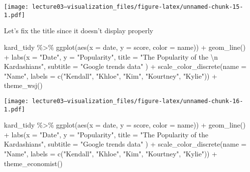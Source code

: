 \documentclass[
]{article}
\newenvironment{Shaded}{\begin{snugshade}}{\end{snugshade}}
\newcommand{\AttributeTok}[1]{\textcolor[rgb]{0.77,0.63,0.00}{#1}}
\newcommand{\FunctionTok}[1]{\textcolor[rgb]{0.00,0.00,0.00}{#1}}
\newcommand{\NormalTok}[1]{#1}
\newcommand{\SpecialCharTok}[1]{\textcolor[rgb]{0.00,0.00,0.00}{#1}}
\newcommand{\StringTok}[1]{\textcolor[rgb]{0.31,0.60,0.02}{#1}}
\begin{document}
\texttt{[image: lecture03---visualization\_files/figure-latex/unnamed-chunk-15-1.pdf]}

Let's fix the title since it doesn't display properly

\begin{Shaded}
\begin{Highlighting}[]
\NormalTok{kard\_tidy }\SpecialCharTok{\%\textgreater{}\%} 
  \FunctionTok{ggplot}\NormalTok{(}\FunctionTok{aes}\NormalTok{(}\AttributeTok{x =}\NormalTok{ date, }\AttributeTok{y =}\NormalTok{ score, }\AttributeTok{color =}\NormalTok{ name)) }\SpecialCharTok{+}
  \FunctionTok{geom\_line}\NormalTok{() }\SpecialCharTok{+}
  \FunctionTok{labs}\NormalTok{(}\AttributeTok{x =} \StringTok{"Date"}\NormalTok{,}
       \AttributeTok{y =} \StringTok{"Popularity"}\NormalTok{,}
       \AttributeTok{title =} \StringTok{"The Popularity of the }\SpecialCharTok{\textbackslash{}n}\StringTok{ Kardashians"}\NormalTok{,}
       \AttributeTok{subtitle =} \StringTok{"Google trends data"}
\NormalTok{       ) }\SpecialCharTok{+}
  \FunctionTok{scale\_color\_discrete}\NormalTok{(}\AttributeTok{name =} \StringTok{"Name"}\NormalTok{,}
                       \AttributeTok{labels =} \FunctionTok{c}\NormalTok{(}\StringTok{"Kendall"}\NormalTok{, }\StringTok{"Khloe"}\NormalTok{, }\StringTok{"Kim"}\NormalTok{, }\StringTok{"Kourtney"}\NormalTok{, }\StringTok{"Kylie"}\NormalTok{)) }\SpecialCharTok{+}
  \FunctionTok{theme\_wsj}\NormalTok{()}
\end{Highlighting}
\end{Shaded}

\texttt{[image: lecture03---visualization\_files/figure-latex/unnamed-chunk-16-1.pdf]}

\begin{Shaded}
\begin{Highlighting}[]
\NormalTok{kard\_tidy }\SpecialCharTok{\%\textgreater{}\%} 
  \FunctionTok{ggplot}\NormalTok{(}\FunctionTok{aes}\NormalTok{(}\AttributeTok{x =}\NormalTok{ date, }\AttributeTok{y =}\NormalTok{ score, }\AttributeTok{color =}\NormalTok{ name)) }\SpecialCharTok{+}
  \FunctionTok{geom\_line}\NormalTok{() }\SpecialCharTok{+}
  \FunctionTok{labs}\NormalTok{(}\AttributeTok{x =} \StringTok{"Date"}\NormalTok{,}
       \AttributeTok{y =} \StringTok{"Popularity"}\NormalTok{,}
       \AttributeTok{title =} \StringTok{"The Popularity of the Kardashians"}\NormalTok{,}
       \AttributeTok{subtitle =} \StringTok{"Google trends data"}
\NormalTok{       ) }\SpecialCharTok{+}
  \FunctionTok{scale\_color\_discrete}\NormalTok{(}\AttributeTok{name =} \StringTok{"Name"}\NormalTok{,}
                       \AttributeTok{labels =} \FunctionTok{c}\NormalTok{(}\StringTok{"Kendall"}\NormalTok{, }\StringTok{"Khloe"}\NormalTok{, }\StringTok{"Kim"}\NormalTok{, }\StringTok{"Kourtney"}\NormalTok{, }\StringTok{"Kylie"}\NormalTok{)) }\SpecialCharTok{+}
  \FunctionTok{theme\_economist}\NormalTok{()}
\end{Highlighting}
\end{Shaded}
\end{document}
